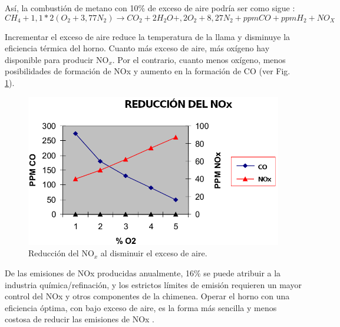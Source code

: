 \par Así, la combustión de metano con 10\% de exceso de aire podría ser como sigue \cite{bib:thermox}:
\begin{equation}
CH_4 + 1,1*2(O_2 + 3,77N_2) \rightarrow CO_2 + 2H_2O + ,2O_2 + 8,27N_2 + ppmCO + ppmH_2 + NO_X\end{equation}
\par Incrementar el exceso de aire reduce la temperatura de la llama y disminuye la eficiencia térmica del horno. Cuanto más exceso de aire, más oxígeno hay disponible para producir NO$_x$. Por el contrario, cuanto menos oxígeno, menos posibilidades de formación de NOx y aumento en la formación de CO (ver Fig. \ref{fig:nox}).
\begin{figure}[H] \begin{center}
\includegraphics[scale=0.42]{images/nox}
\caption[Reducción del NO$_x$ al disminuir el exceso de aire de combustión]{Reducción del NO$_x$ al disminuir el exceso de aire.\cite{bib:thermox}}
\label{fig:nox} \end{center} \end{figure}
\par De las emisiones de NOx producidas anualmente, 16\% se puede atribuir a la industria química/refinación, y los estrictos límites de emisión requieren un mayor control del NOx y otros componentes de la chimenea. Operar el horno con una eficiencia óptima, con bajo exceso de aire, es la forma más sencilla y menos costosa de reducir las emisiones de NOx \cite{bib:thermox}.

